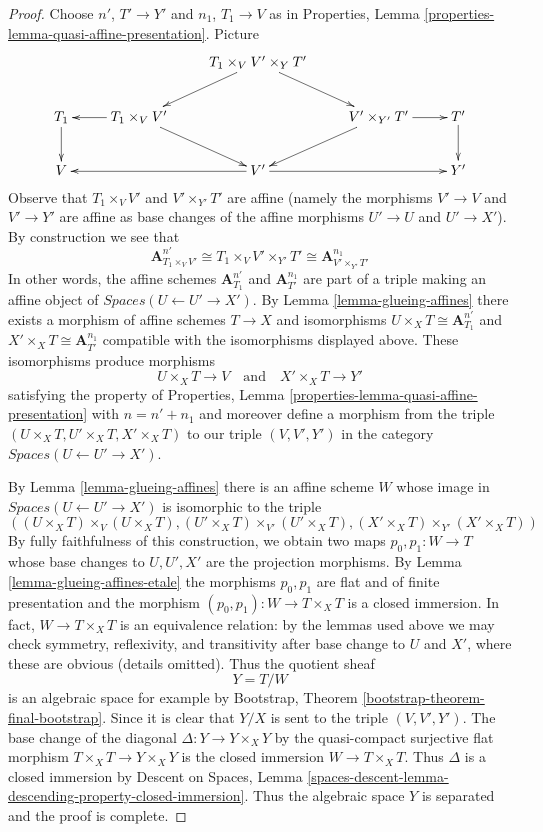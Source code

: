 \documentclass[10pt,a4paper]{amsart}
\theoremstyle{plain}
\theoremstyle{definition}
\theoremstyle{remark}
\numberwithin{equation}{subsection}
\begin{document}
\begin{proof}
Choose $n'$, $T' \to Y'$ and $n_1$, $T_1 \to V$ as in
Properties, Lemma \ref{properties-lemma-quasi-affine-presentation}.
Picture
$$
\xymatrix{
& &
T_1 \times_V V' \times_Y T' \ar[ld] \ar[rd] \\
T_1 \ar[d] &
T_1 \times_V V' \ar[l] \ar[dr] & &
V' \times_{Y'} T' \ar[r] \ar[dl] &
T' \ar[d] \\
V & &
V' \ar[rr] \ar[ll] & &
Y'
}
$$
Observe that $T_1 \times_V V'$ and $V' \times_{Y'} T'$
are affine (namely the morphisms $V' \to V$ and $V' \to Y'$
are affine as base changes of the affine morphisms $U' \to U$
and $U' \to X'$). By construction we see that
$$
\mathbf{A}^{n'}_{T_1 \times_V V'} \cong
T_1 \times_V V' \times_{Y'} T' \cong
\mathbf{A}^{n_1}_{V' \times_{Y'} T'}
$$
In other words, the affine schemes $\mathbf{A}^{n'}_{T_1}$
and $\mathbf{A}^{n_1}_{T'}$ are part of a triple making an affine object of
$\textit{Spaces}(U \leftarrow U' \to X')$.
By Lemma \ref{lemma-glueing-affines}
there exists a morphism of affine schemes $T \to X$
and isomorphisms $U \times_X T \cong \mathbf{A}^{n'}_{T_1}$
and $X' \times_X T \cong \mathbf{A}^{n_1}_{T'}$ compatible
with the isomorphisms displayed above.
These isomorphisms produce morphisms
$$
U \times_X T \longrightarrow V
\quad\text{and}\quad
X' \times_X T \longrightarrow Y'
$$
satisfying the property of
Properties, Lemma \ref{properties-lemma-quasi-affine-presentation}
with $n = n' + n_1$ and moreover define a morphism from the triple
$(U \times_X T, U' \times_X T, X' \times_X T)$ to
our triple $(V, V', Y')$ in the category
$\textit{Spaces}(U \leftarrow U' \to X')$.

\medskip\noindent
By Lemma \ref{lemma-glueing-affines} there is an affine scheme $W$ whose
image in $\textit{Spaces}(U \leftarrow U' \to X')$ is isomorphic to
the triple
$$
((U \times_X T) \times_V (U \times_X T),
(U' \times_X T) \times_{V'} (U' \times_X T),
(X' \times_X T) \times_{Y'} (X' \times_X T))
$$
By fully faithfulness of this construction, we obtain
two maps $p_0, p_1 : W \to T$ whose base changes
to $U, U', X'$ are the projection morphisms.
By Lemma \ref{lemma-glueing-affines-etale}
the morphisms $p_0, p_1$ are flat and of finite presentation and
the morphism $(p_0, p_1) : W \to T \times_X T$ is a closed immersion.
In fact, $W \to T \times_X T$ is an equivalence relation: by the lemmas
used above we may check symmetry, reflexivity, and transitivity
after base change to $U$ and $X'$, where these are obvious (details omitted).
Thus the quotient sheaf
$$
Y = T/W
$$
is an algebraic space for example by
Bootstrap, Theorem \ref{bootstrap-theorem-final-bootstrap}.
Since it is clear that $Y/X$ is sent to the triple $(V, V', Y')$.
The base change of the diagonal $\Delta : Y \to Y \times_X Y$
by the quasi-compact surjective flat morphism $T \times_X T \to Y \times_X Y$
is the closed immersion $W \to T \times_X T$. Thus $\Delta$
is a closed immersion by Descent on Spaces, Lemma
\ref{spaces-descent-lemma-descending-property-closed-immersion}.
Thus the algebraic space $Y$ is separated and the proof is complete.
\end{proof}
\end{document}
